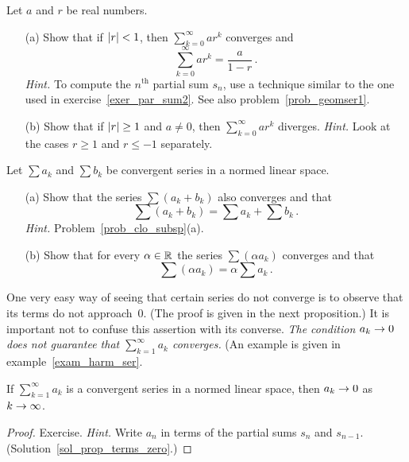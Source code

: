 \begin{prob}\label{prob_geomser2}
Let $a$ and $r$ be real numbers.
 \begin{enumerate}
  \item[(a)] Show that if $\lvert r\rvert < 1$, then $\sum_{k=0}^\infty ar^k$ converges and
    \[ \sum_{k=0}^\infty ar^k = \frac a{1-r}\,. \]
\emph{Hint.}  To compute the $n^{\text{th}}$ partial sum $s_n$, use a technique similar
to the one used in exercise~\ref{exer_par_sum2}. See also problem~\ref{prob_geomser1}.
  \item[(b)] Show that if $\lvert r\rvert \ge 1$ and $a \ne 0$, then $\sum_{k=0}^\infty ar^k$
diverges. \emph{Hint.} Look at the cases $r \ge 1$ and $r \le -1$ separately.
 \end{enumerate}
\end{prob}

\begin{prob} Let $\sum a_k$ and $\sum b_k$ be convergent series in a normed linear space.
 \begin{enumerate}
  \item[(a)] Show that the series $\sum(a_k + b_k)$ also converges and that
    \[ \sum(a_k + b_k) = \sum a_k + \sum b_k\,. \]
\emph{Hint.} Problem~\ref{prob_clo_subsp}(a).
  \item[(b)] Show that for every $\alpha \in \mathbb{R}$ the series $\sum (\alpha a_k)$ converges
and that
    \[ \sum (\alpha a_k) = \alpha \sum a_k\,. \]
 \end{enumerate}
\end{prob}

One very easy way of seeing that certain series do not converge is to observe that its terms
do not approach~$0$.  (The proof is given in the next proposition.)  It is important not to
confuse this assertion with its converse.  \emph{The condition $a_k \rightarrow 0$ does not guarantee
that $\sum_{k=1}^\infty a_k$ converges.}  (An example is given in example~\ref{exam_harm_ser}.

\begin{prop}\label{prop_terms_zero}  If $\sum_{k=1}^\infty a_k$ is a convergent series in a
normed linear space, then $a_k \rightarrow 0$ as $k \rightarrow \infty$.
\end{prop}

\begin{proof}  Exercise. \emph{Hint.}  Write $a_n$ in terms of the partial sums $s_n$ and
$s_{n-1}$.   (Solution~\ref{sol_prop_terms_zero}.) \ns
\end{proof}

